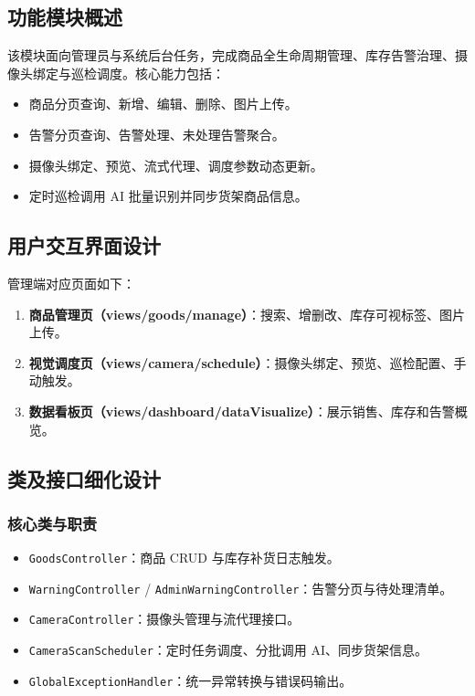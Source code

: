 \subsection{功能模块概述}
该模块面向管理员与系统后台任务，完成商品全生命周期管理、库存告警治理、摄像头绑定与巡检调度。核心能力包括：
\begin{itemize}[leftmargin=2em]
  \item 商品分页查询、新增、编辑、删除、图片上传。
  \item 告警分页查询、告警处理、未处理告警聚合。
  \item 摄像头绑定、预览、流式代理、调度参数动态更新。
  \item 定时巡检调用 AI 批量识别并同步货架商品信息。
\end{itemize}

\subsection{用户交互界面设计}
管理端对应页面如下：
\begin{enumerate}[leftmargin=2em]
  \item \textbf{商品管理页（views/goods/manage）}：搜索、增删改、库存可视标签、图片上传。
  \item \textbf{视觉调度页（views/camera/schedule）}：摄像头绑定、预览、巡检配置、手动触发。
  \item \textbf{数据看板页（views/dashboard/dataVisualize）}：展示销售、库存和告警概览。
\end{enumerate}

\subsection{类及接口细化设计}

\subsubsection{核心类与职责}
\begin{itemize}[leftmargin=2em]
  \item \texttt{GoodsController}：商品 CRUD 与库存补货日志触发。
  \item \texttt{WarningController} / \texttt{AdminWarningController}：告警分页与待处理清单。
  \item \texttt{CameraController}：摄像头管理与流代理接口。
  \item \texttt{CameraScanScheduler}：定时任务调度、分批调用 AI、同步货架信息。
  \item \texttt{GlobalExceptionHandler}：统一异常转换与错误码输出。
\end{itemize}

